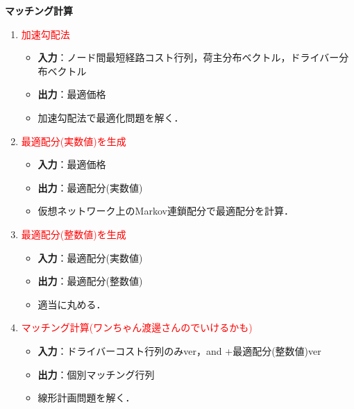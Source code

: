 \documentclass[a4paper,dvipdfmx]{ujarticle}
\begin{document}
    \textbf{マッチング計算}
    \begin{enumerate}
        \item \textcolor{red}{加速勾配法}
            \begin{itemize}
                \item \textbf{入力}：ノード間最短経路コスト行列，荷主分布ベクトル，ドライバー分布ベクトル
                \item \textbf{出力}：最適価格
                \item 加速勾配法で最適化問題を解く．
            \end{itemize}

        \item \textcolor{red}{最適配分(実数値)を生成}
            \begin{itemize}
                \item \textbf{入力}：最適価格
                \item \textbf{出力}：最適配分(実数値)
                \item 仮想ネットワーク上のMarkov連鎖配分で最適配分を計算．
            \end{itemize}

        \item \textcolor{red}{最適配分(整数値)を生成}
            \begin{itemize}
                \item \textbf{入力}：最適配分(実数値)
                \item \textbf{出力}：最適配分(整数値)
                \item 適当に丸める．
            \end{itemize}

        \item \textcolor{red}{マッチング計算(ワンちゃん渡邊さんのでいけるかも)}
            \begin{itemize}
                \item \textbf{入力}：ドライバーコスト行列のみver，and +最適配分(整数値)ver
                \item \textbf{出力}：個別マッチング行列
                \item 線形計画問題を解く．
            \end{itemize}
    \end{enumerate}
\end{document}
